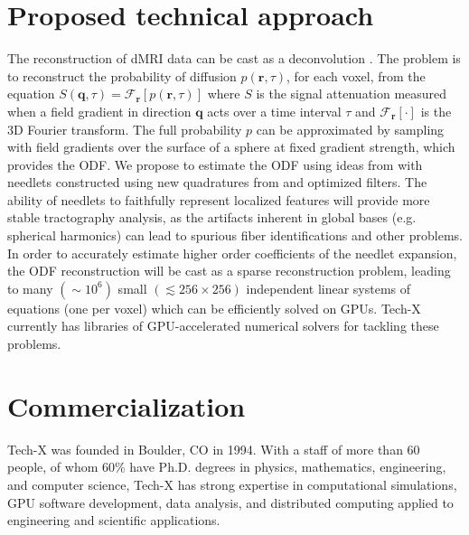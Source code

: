 \documentclass[10pt]{article}
\begin{document}
\section*{Proposed technical approach}
\vspace{-5pt}
The reconstruction of dMRI data can be cast as a
deconvolution \cite{Lenglet2008}. The problem is
to reconstruct the probability of diffusion $p({\mathbf r},\tau)$, for each
voxel, from the equation $S\left({\mathbf q},\tau\right) = \mathcal{F}_{\mathbf r}\left[p({\mathbf r},\tau)\right]$ where $S$ is the signal attenuation measured when a field gradient in
direction ${\mathbf q}$ acts over a time interval $\tau$ and $\mathcal{F}_{\mathbf r}\left[\cdot\right]$ is
the 3D Fourier transform.  The full probability $p$ can be approximated by sampling
with field gradients over the surface of a sphere at fixed gradient strength, which provides the 
ODF. We propose to estimate the ODF using ideas from
\cite{KE-NG-PI-2009} with needlets constructed using new quadratures from
\cite{AHR-BEY-2009} and optimized filters.  The ability of needlets to
faithfully represent localized features will provide more stable
tractography analysis, as the artifacts inherent in global bases
(e.g. spherical harmonics) can lead to spurious fiber identifications and other
problems.  In order to accurately estimate higher order coefficients of the
needlet expansion, the ODF reconstruction will be cast as a sparse reconstruction
problem, leading to many $(\sim 10^6)$ small $(\lesssim 256\times256)$ independent linear
systems of equations (one per voxel) which can be efficiently solved on GPUs. Tech-X currently
has libraries of GPU-accelerated numerical solvers for tackling these problems.

\vspace{-8pt}
\section*{Commercialization}
\vspace{-5pt}
Tech-X was founded in Boulder, CO in 1994. With a staff of more than 60 people,
of whom 60\% have Ph.D. degrees in physics, mathematics, engineering, and
computer science, Tech-X has strong expertise in computational simulations, GPU
software development, data analysis, and distributed computing applied to
engineering and scientific applications.
\end{document}
